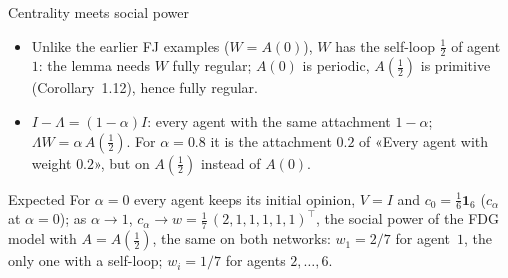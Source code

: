 \documentclass[10pt, aspectratio=169]{beamer}
\begin{document}
\begin{frame}[label=m-lemma,t]{Centrality meets social power}
{  \smallskip
  \begin{itemize}
    \setlength{\itemsep}{1pt}
    \item Unlike the earlier FJ examples ($W = A(0)$), $W$ has the self-loop $\frac12$ of
          agent~$1$: the lemma needs $W$ fully regular; $A(0)$ is periodic, $A(\frac12)$ is
          primitive (Corollary~1.12), hence fully regular.
    \item $I - \Lambda = (1 - \alpha) I$: every agent with the same attachment
          $1 - \alpha$; $\Lambda W = \alpha\, A(\frac12)$. For
          $\alpha = 0.8$ it is the attachment $0.2$ of «Every agent with weight $0.2$», but
          on $A(\frac12)$ instead of $A(0)$.
  \end{itemize}
  \begin{alertblock}{Expected}
    \footnotesize
    For $\alpha = 0$ every agent keeps its initial opinion, $V = I$ and
    $c_0 = \frac16\mathbf{1}_6$ ($c_\alpha$ at $\alpha = 0$); as $\alpha \to 1$, $c_\alpha \to w = \frac17\,(2, 1, 1, 1, 1, 1)^\top$,
    the social power of the FDG model with $A = A(\frac12)$, the same on both networks:
    $w_1 = 2/7$ for agent~$1$, the only one with a self-loop; $w_i = 1/7$ for agents
    $2, \dots, 6$.
  \end{alertblock}
  }%
\end{frame}
\end{document}
